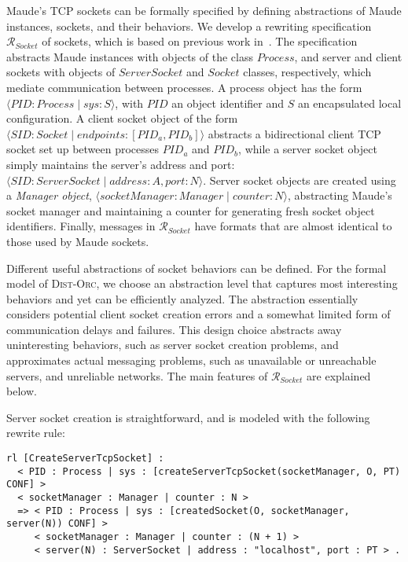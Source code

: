 \documentclass{eptcs}
\begin{document}
Maude's TCP sockets can be formally specified by defining abstractions of Maude instances, sockets, and their behaviors. We develop a rewriting specification $\mathcal{R}_{Socket}$ of sockets, which is based on previous work in~\cite{DuranRV07,RiescoV07}. 
The specification abstracts Maude instances with objects of the class $\mathit{Process}$, and server and client sockets with objects of $\mathit{ServerSocket}$ and $\mathit{Socket}$ classes, respectively, which  mediate communication between processes. A process object has the form $\langle \mathit{PID} : Process \;|\; \mathit{sys}: S \rangle$, with $\mathit{PID}$ an object identifier and $S$ an encapsulated local configuration. A client socket object of the form 
$\langle \mathit{SID} : Socket \;|\; endpoints : [\mathit{PID}_{a}, \mathit{PID}_{b}] \rangle$
abstracts a bidirectional client TCP socket set up between processes $\mathit{PID}_{a}$ and $\mathit{PID}_{b}$, while a server socket object simply maintains the server's address and port: $\langle \mathit{SID} : \mathit{ServerSocket} \;|\; \mathit{address} : A, \mathit{port} : N \rangle$.
Server socket objects are created using a \emph{Manager object}, $\langle \mathit{socketManager} : \mathit{Manager} \;|\; \mathit{counter} : N \rangle$, abstracting Maude's socket manager and maintaining a counter for generating fresh socket object identifiers. Finally, messages in $\mathcal{R}_{Socket}$ have formats that are almost identical to those used by Maude sockets.

Different useful abstractions of socket behaviors can be defined. For the formal model of \textsc{Dist-Orc}, we choose an abstraction level that captures most interesting behaviors and yet can be efficiently analyzed. The abstraction essentially considers potential client socket creation errors and a somewhat limited form of communication delays and failures. This design choice abstracts away uninteresting behaviors, such as server socket creation problems, and approximates actual messaging problems, such as unavailable or unreachable servers, and unreliable networks. The main features of $\mathcal{R}_{Socket}$ are explained below.


Server socket creation is straightforward, and is modeled with the following rewrite rule:

\begin{small}
\begin{verbatim}
rl [CreateServerTcpSocket] : 
  < PID : Process | sys : [createServerTcpSocket(socketManager, O, PT) CONF] >
  < socketManager : Manager | counter : N >
  => < PID : Process | sys : [createdSocket(O, socketManager, server(N)) CONF] >
     < socketManager : Manager | counter : (N + 1) >
     < server(N) : ServerSocket | address : "localhost", port : PT > .
\end{verbatim}
\end{small}
\end{document}
